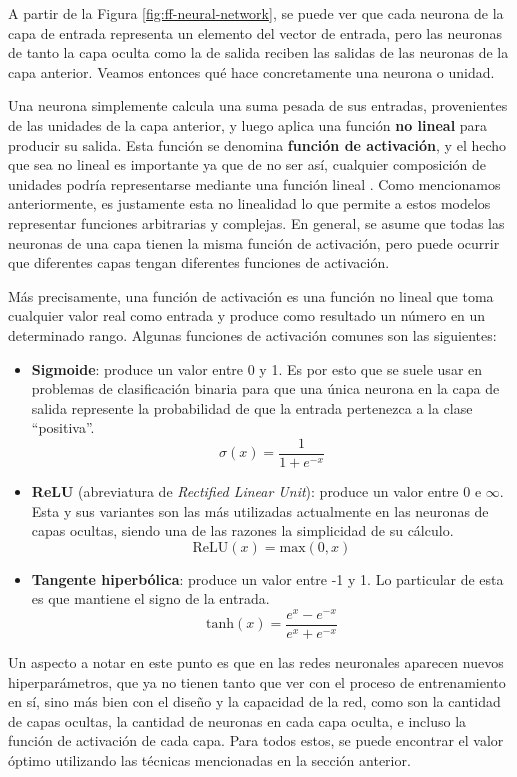 \documentclass[../../main.tex]{subfiles}
\begin{document}
A partir de la Figura \ref{fig:ff-neural-network}, se puede ver que cada neurona de la
capa de entrada representa un elemento del vector de entrada, pero las neuronas de tanto
la capa oculta como la de salida reciben las salidas de las neuronas de la capa anterior.
Veamos entonces qué hace concretamente una neurona o unidad.

Una neurona simplemente calcula una suma pesada de sus entradas, provenientes de las
unidades de la capa anterior, y luego aplica una función \textbf{no lineal} para producir
su salida. Esta función se denomina \textbf{función de activación}, y el hecho que sea no
lineal es importante ya que de no ser así, cualquier composición de unidades podría
representarse mediante una función lineal \cite{ai-a-modern-approach}. Como mencionamos
anteriormente, es justamente esta no linealidad lo que permite a estos modelos representar
funciones arbitrarias \cite{ai-a-modern-approach} y complejas. En general, se asume que
todas las neuronas de una capa tienen la misma función de activación, pero puede ocurrir
que diferentes capas tengan diferentes funciones de activación.

Más precisamente, una función de activación es una función no lineal que toma cualquier
valor real como entrada y produce como resultado un número en un determinado rango.
Algunas funciones de activación comunes son las siguientes:
\begin{itemize}[itemsep=0.1cm]
    \item \textbf{Sigmoide}: produce un valor entre 0 y 1. Es por esto que se suele usar
    en problemas de clasificación binaria para que una única neurona en la capa de salida
    represente la probabilidad de que la entrada pertenezca a la clase ``positiva''.
    \[\sigma(x)=\frac{1}{1+e^{-x}}\]
    \item \textbf{ReLU} (abreviatura de \textit{Rectified Linear Unit}): produce un valor
    entre 0 e \(\infty\). Esta y sus variantes son las más utilizadas actualmente en las
    neuronas de capas ocultas, siendo una de las razones la simplicidad de su cálculo.
    \[\text{ReLU}(x) = \text{max}(0, x)\]
    \item \textbf{Tangente hiperbólica}: produce un valor entre -1 y 1. Lo particular de
    esta es que mantiene el signo de la entrada.
    \[\text{tanh}(x)=\frac{e^x - e^{-x}}{e^x + e^{-x}}\]
\end{itemize}

Un aspecto a notar en este punto es que en las redes neuronales aparecen nuevos
hiperparámetros, que ya no tienen tanto que ver con el proceso de entrenamiento en sí,
sino más bien con el diseño y la capacidad de la red, como son la cantidad de capas
ocultas, la cantidad de neuronas en cada capa oculta, e incluso la función de activación
de cada capa. Para todos estos, se puede encontrar el valor óptimo utilizando las técnicas
mencionadas en la sección anterior.
\end{document}
